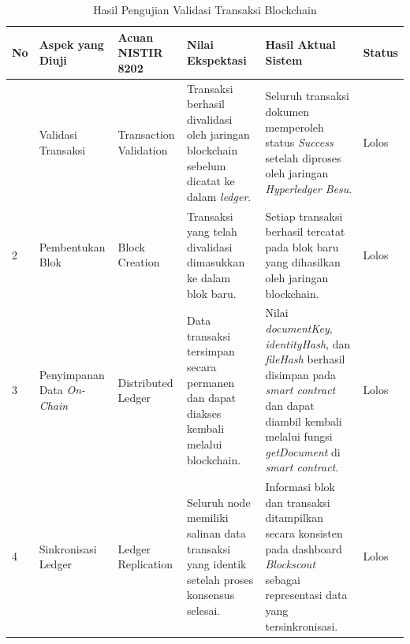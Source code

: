 		\begin{landscape}
			\renewcommand{\arraystretch}{1.3}
			\begin{table}[ht]
				\centering
				\caption{Hasil Pengujian Validasi Transaksi Blockchain}
				\label{tab:pengujian_validasi_transaksi}

				\begin{tabular}{|
				>{\centering\arraybackslash}p{0.8cm}|
				>{\raggedright\arraybackslash}p{4cm}|
				>{\raggedright\arraybackslash}p{3.5cm}|
				p{6cm}|
				p{6.5cm}|
				>{\centering\arraybackslash}p{1.8cm}|}
				\hline

				\textbf{No} &
				\textbf{Aspek yang Diuji} &
				\textbf{Acuan NISTIR 8202} &
				\textbf{Nilai Ekspektasi} &
				\textbf{Hasil Aktual Sistem} &
				\textbf{Status} \\ \hline

				1 &
				Validasi Transaksi &
				Transaction Validation &
				Transaksi berhasil divalidasi oleh jaringan blockchain sebelum dicatat ke dalam \textit{ledger}. &
				Seluruh transaksi dokumen memperoleh status \textit{Success} setelah diproses oleh jaringan \textit{Hyperledger Besu}. &
				Lolos \\ \hline

				2 &
				Pembentukan Blok &
				Block Creation &
				Transaksi yang telah divalidasi dimasukkan ke dalam blok baru. &
				Setiap transaksi berhasil tercatat pada blok baru yang dihasilkan oleh jaringan blockchain. &
				Lolos \\ \hline

				3 &
				Penyimpanan Data \textit{On-Chain} &
				Distributed Ledger &
				Data transaksi tersimpan secara permanen dan dapat diakses kembali melalui blockchain. &
				Nilai \textit{documentKey}, \textit{identityHash}, dan \textit{fileHash} berhasil disimpan pada \textit{smart contract} dan dapat diambil kembali melalui fungsi \textit{getDocument} di \textit{smart contract}. &
				Lolos \\ \hline

				4 &
				Sinkronisasi Ledger &
				Ledger Replication &
				Seluruh node memiliki salinan data transaksi yang identik setelah proses konsensus selesai. &
				Informasi blok dan transaksi ditampilkan secara konsisten pada dashboard \textit{Blockscout} sebagai representasi data yang tersinkronisasi. &
				Lolos \\ \hline

				\end{tabular}
			\end{table}

		\end{landscape}


